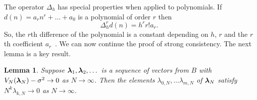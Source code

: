 \documentclass[aap]{imsart}
\newtheorem{lemma}{Lemma}
\begin{document}
The operator $\Delta_h$ has special properties when applied to polynomials. If $d(n) = a_r n^r + \dots + a_0$ is a polynomial of order $r$ then
 \begin{equation} \label{eq:mfinitediffpoly}
 \Delta_h^r d(n) = h^r r! a_r. 
 \end{equation}
So, the $r$th difference of the polynomial is a constant depending on $h$, $r$ and the $r$th coefficient $a_r$~\cite[page 51]{Jordan_Calculus_of_finite_difference_1965}.  We can now continue the proof of strong consistency.  The next lemma is a key result.

\begin{lemma}\label{lem:moran2}
Suppose $\boldsymbol{\lambda}_1, \boldsymbol{\lambda}_2,\dots$ is a sequence of vectors from $B$ with $V_N(\boldsymbol{\lambda}_N) - \sigma^2\rightarrow 0$ as $N\rightarrow\infty$. Then the elements $\lambda_{0,N}, \dots \lambda_{m,N}$ of $\boldsymbol{\lambda}_N$ satisfy $N^k\lambda_{k, N}\rightarrow0$ as $N\rightarrow\infty$.
\end{lemma}
\end{document}
